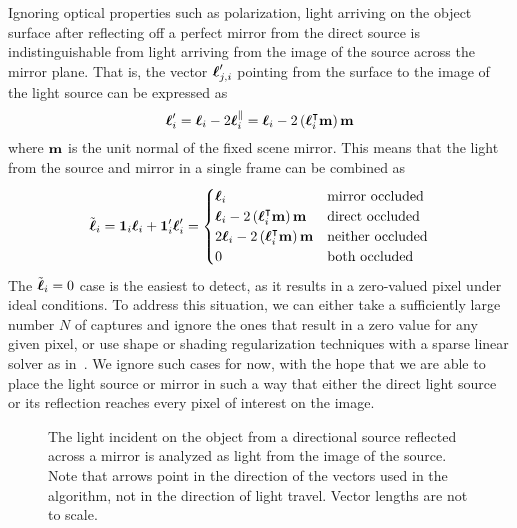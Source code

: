 Ignoring optical properties such as polarization, light arriving on the object
surface after reflecting off a perfect mirror from the direct source is
indistinguishable from light arriving from the image of the source across the
mirror plane. That is, the vector $\boldsymbol{\ell}_{j, i}'$ pointing from the surface to
the image of the light source can be expressed as
\begin{equation}
  \boldsymbol{\ell}_i' = \boldsymbol{\ell}_i - 2 \boldsymbol{\ell}_i^\parallel
            = \boldsymbol{\ell}_i - 2 \left(\boldsymbol{\ell}_i^\intercal \mathbf{m}\right) \mathbf{m}
\end{equation}
where $\mathbf{m}$ is the unit normal of the fixed scene mirror. This means that the
light from the source and mirror in a single frame can be
combined as
\begin{equation}
  \tilde{\boldsymbol{\ell}}_i = \mathbf{1}_i \boldsymbol{\ell}_i + \mathbf{1}_i' \boldsymbol{\ell}_i'
                   = \begin{cases}
    \boldsymbol{\ell}_i                                                       & \textrm{mirror occluded} \\
    \boldsymbol{\ell}_i - 2 \left(\boldsymbol{\ell}_i^\intercal \mathbf{m}\right) \mathbf{m}   & \textrm{direct occluded} \\
    2 \boldsymbol{\ell}_i - 2 \left(\boldsymbol{\ell}_i^\intercal \mathbf{m}\right) \mathbf{m} & \textrm{neither occluded} \\
    0                                                              & \textrm{both occluded}
  \end{cases}
\end{equation}
The $\tilde{\boldsymbol{\ell}}_i = 0$ case is the easiest to detect, as it results in a
zero-valued pixel under ideal conditions. To address this situation, we can
either take a sufficiently large number $N$ of captures and ignore the ones
that result in a zero value for any given pixel, or use shape or shading
regularization techniques with a sparse linear solver as in~\cite{hernandez}.
We ignore such cases for now, with the hope that we are able to place the light
source or mirror in such a way that either the direct light source or its
reflection reaches every pixel of interest on the image.
\begin{figure}\label{fig:light-reflection}
  
  \caption{The light incident on the object from a directional source reflected
  across a mirror is analyzed as light from the image of the source. Note that
  arrows point in the direction of the vectors used in the algorithm, not in
  the direction of light travel. Vector lengths are not to scale.}
\end{figure}
